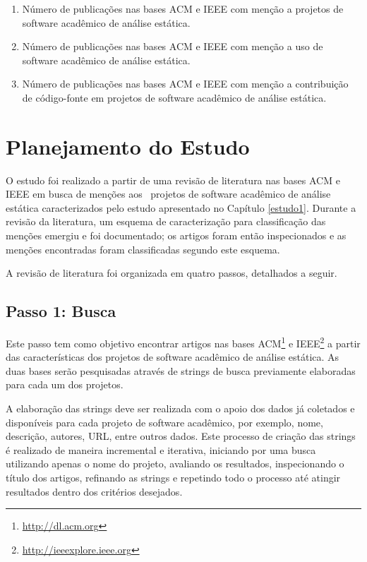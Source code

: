 \begin{enumerate}
  \item Número de publicações nas bases ACM e IEEE com menção a projetos de
    software acadêmico de análise estática.
  \item Número de publicações nas bases ACM e IEEE com menção a uso de
    software acadêmico de análise estática.
  \item Número de publicações nas bases ACM e IEEE com menção a contribuição de
    código-fonte em projetos de software acadêmico de análise estática.
\end{enumerate}


\section{Planejamento do Estudo} \label{estudo2:planejamento} %

O estudo foi realizado a partir de uma revisão de literatura nas bases ACM e
IEEE em busca de menções aos \SoftwareCount \ projetos de software acadêmico de
análise estática caracterizados pelo estudo apresentado no Capítulo \ref{estudo1}. 
Durante a revisão da literatura, 
um esquema de caracterização para classificação das menções emergiu e foi documentado;
os artigos foram então inspecionados e as menções encontradas foram classificadas segundo
este esquema.

A revisão de literatura foi organizada em quatro passos, detalhados a seguir.

\subsection{Passo 1: Busca}

Este passo tem como objetivo encontrar artigos nas bases
ACM\footnote{\url{http://dl.acm.org}} e
IEEE\footnote{\url{http://ieeexplore.ieee.org}} a partir das características
dos projetos de software acadêmico de análise estática.
As duas bases serão pesquisadas através de strings de busca previamente
elaboradas para cada um dos projetos.

A elaboração das strings deve ser realizada com o apoio dos dados já coletados
e disponíveis para cada projeto de software acadêmico, por exemplo, nome,
descrição, autores, URL, entre outros dados. Este processo de criação das
strings é realizado de maneira incremental e iterativa, iniciando por uma busca
utilizando apenas o nome do projeto, avaliando os resultados, inspecionando o
título dos artigos, refinando as strings e repetindo todo o processo até
atingir resultados dentro dos critérios desejados.

